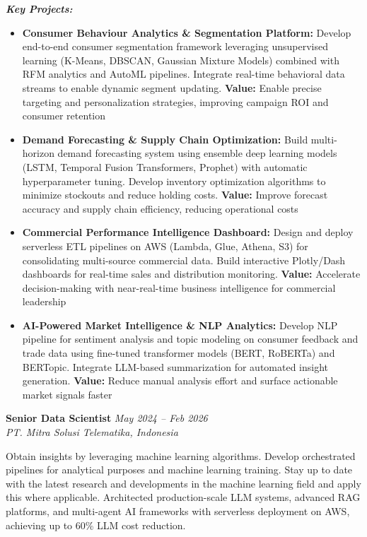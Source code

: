 \documentclass[10pt,a4paper]{article}
\newcommand{\experience}[4]{%
    \noindent\textbf{#1} \hfill \textit{#2}\\
    \textit{#3} \hfill #4\vspace{2pt}
}
\begin{document}
\textit{\textbf{Key Projects:}}
\begin{itemize}
    \item \textbf{Consumer Behaviour Analytics \& Segmentation Platform:} Develop end-to-end consumer segmentation framework leveraging unsupervised learning (K-Means, DBSCAN, Gaussian Mixture Models) combined with RFM analytics and AutoML pipelines. Integrate real-time behavioral data streams to enable dynamic segment updating. \textcolor{accent}{\textbf{Value:}} Enable precise targeting and personalization strategies, improving campaign ROI and consumer retention
    \item \textbf{Demand Forecasting \& Supply Chain Optimization:} Build multi-horizon demand forecasting system using ensemble deep learning models (LSTM, Temporal Fusion Transformers, Prophet) with automatic hyperparameter tuning. Develop inventory optimization algorithms to minimize stockouts and reduce holding costs. \textcolor{accent}{\textbf{Value:}} Improve forecast accuracy and supply chain efficiency, reducing operational costs
    \item \textbf{Commercial Performance Intelligence Dashboard:} Design and deploy serverless ETL pipelines on AWS (Lambda, Glue, Athena, S3) for consolidating multi-source commercial data. Build interactive Plotly/Dash dashboards for real-time sales and distribution monitoring. \textcolor{accent}{\textbf{Value:}} Accelerate decision-making with near-real-time business intelligence for commercial leadership
    \item \textbf{AI-Powered Market Intelligence \& NLP Analytics:} Develop NLP pipeline for sentiment analysis and topic modeling on consumer feedback and trade data using fine-tuned transformer models (BERT, RoBERTa) and BERTopic. Integrate LLM-based summarization for automated insight generation. \textcolor{accent}{\textbf{Value:}} Reduce manual analysis effort and surface actionable market signals faster
\end{itemize}

\vspace{4pt}

\experience{Senior Data Scientist}{May 2024 -- Feb 2026}{PT. Mitra Solusi Telematika, Indonesia}{}

Obtain insights by leveraging machine learning algorithms. Develop orchestrated pipelines for analytical purposes and machine learning training. Stay up to date with the latest research and developments in the machine learning field and apply this where applicable. Architected production-scale LLM systems, advanced RAG platforms, and multi-agent AI frameworks with serverless deployment on AWS, achieving up to 60\% LLM cost reduction.
\end{document}
